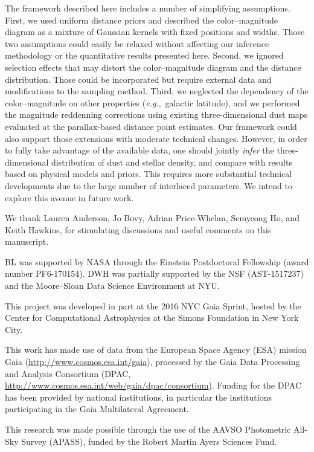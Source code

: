\documentclass[manuscript, letterpaper]{aastex6}
\newcommand{\eg}{{\textit{e.g.},~}}
\begin{document}
The framework described here includes a number of simplifying assumptions. 
First, we used uniform distance priors and described the color--magnitude diagram as a mixture of Gaussian kernels with fixed positions and widths.
Those two assumptions could easily be relaxed without affecting our inference methodology or the quantitative results presented here.
Second, we ignored selection effects that may distort the color--magnitude diagram and the distance distribution.
Those could be incorporated but require external data and modifications to the sampling method.
Third, we neglected the dependency of the color--magnitude on other properties (\eg galactic latitude), and we performed the magnitude reddenning corrections using existing three-dimensional dust maps evaluated at the parallax-based distance point estimates.
Our framework could also support those extensions with moderate technical changes.
However, in order to fully take advantage of the available data, one should jointly \textit{infer} the three-dimensional distribution of dust and stellar density, and compare with results based on physical models and priors.
This requires more substantial technical developments due to the large number of interlaced parameters.
We intend to explore this avenue in future work.


\acknowledgments

We thank Lauren Anderson, Jo Bovy, Adrian Price-Whelan, Semyeong Ho, and Keith Hawkins, for stimulating discussions and useful comments on this manuscript.

BL was supported by NASA through the Einstein Postdoctoral Fellowship (award number PF6-170154).
DWH was partially supported by the NSF (AST-1517237) and the Moore--Sloan Data Science Environment at NYU.

This project was developed in part at the 2016 NYC Gaia Sprint, hosted by the Center for Computational Astrophysics at the Simons Foundation in New York City.

This work has made use of data from the European Space Agency (ESA) mission Gaia (\url{http://www.cosmos.esa.int/gaia}), processed by the Gaia Data Processing and Analysis Consortium (DPAC, \url{http://www.cosmos.esa.int/web/gaia/dpac/consortium}). Funding for the DPAC has been provided by national institutions, in particular the institutions participating in the Gaia Multilateral Agreement.

This research was made possible through the use of the AAVSO Photometric All-Sky Survey (APASS), funded by the Robert Martin Ayers Sciences Fund.







\end{document}
